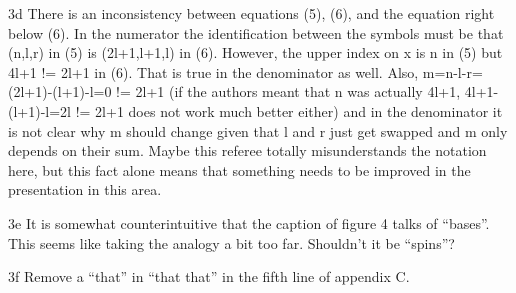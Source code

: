 \begin{point}{3d}
There is an inconsistency between equations (5), (6), and the
equation right below (6). In the numerator the identification between
the symbols must be that (n,l,r) in (5) is (2l+1,l+1,l) in (6).
However, the upper index on x is n in (5) but 4l+1 != 2l+1 in (6).
That is true in the denominator as well. Also,
m=n-l-r=(2l+1)-(l+1)-l=0 != 2l+1 (if the authors meant that n was
actually 4l+1, 4l+1-(l+1)-l=2l != 2l+1 does not work much better
either) and in the denominator it is not clear why m should change
given that l and r just get swapped and m only depends on their sum.
Maybe this referee totally misunderstands the notation here, but this
fact alone means that something needs to be improved in the
presentation in this area.
\end{point}


\begin{point}{3e}
It is somewhat counterintuitive that the caption of figure 4 talks
of ``bases''. This seems like taking the analogy a bit too far.
Shouldn't it be ``spins''?
\end{point}


\begin{point}{3f}
Remove a ``that'' in ``that that'' in the fifth line of appendix C.
\end{point}


